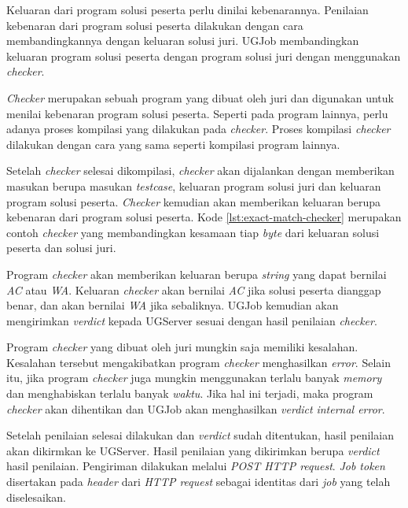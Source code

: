 \par Keluaran dari program solusi peserta perlu dinilai kebenarannya. Penilaian kebenaran dari program solusi peserta dilakukan dengan cara membandingkannya dengan keluaran solusi juri. UGJob membandingkan keluaran program solusi peserta dengan program solusi juri dengan menggunakan \textit{checker}.

\par \textit{Checker} merupakan sebuah program yang dibuat oleh juri dan digunakan untuk menilai kebenaran program solusi peserta. Seperti pada program lainnya, perlu adanya proses kompilasi yang dilakukan pada \textit{checker}. Proses kompilasi \textit{checker} dilakukan dengan cara yang sama seperti kompilasi program lainnya.



\par Setelah \textit{checker} selesai dikompilasi, \textit{checker} akan dijalankan dengan memberikan masukan berupa masukan \textit{testcase}, keluaran program solusi juri dan keluaran program solusi peserta. \textit{Checker} kemudian akan memberikan keluaran berupa kebenaran dari program solusi peserta. Kode \ref{lst:exact-match-checker} merupakan contoh \textit{checker} yang membandingkan kesamaan tiap \textit{byte} dari keluaran solusi peserta dan solusi juri.

\par Program \textit{checker} akan memberikan keluaran berupa \textit{string} yang dapat bernilai \textit{AC} atau \textit{WA}. Keluaran \textit{checker} akan bernilai \textit{AC} jika solusi peserta dianggap benar, dan akan bernilai \textit{WA} jika sebaliknya. UGJob kemudian akan mengirimkan \textit{verdict} kepada UGServer sesuai dengan hasil penilaian \textit{checker}.

\par Program \textit{checker} yang dibuat oleh juri mungkin saja memiliki kesalahan. Kesalahan tersebut mengakibatkan program \textit{checker} menghasilkan \textit{error}. Selain itu, jika program \textit{checker} juga mungkin menggunakan terlalu banyak \textit{memory} dan menghabiskan terlalu banyak \textit{waktu}. Jika hal ini terjadi, maka program \textit{checker} akan dihentikan dan UGJob akan menghasilkan \textit{verdict} \textit{internal error}.

\par Setelah penilaian selesai dilakukan dan \textit{verdict} sudah ditentukan, hasil penilaian akan dikirmkan ke UGServer. Hasil penilaian yang dikirimkan berupa \textit{verdict} hasil penilaian. Pengiriman dilakukan melalui \textit{POST HTTP request}. \textit{Job token} disertakan pada \textit{header} dari \textit{HTTP request} sebagai identitas dari \textit{job} yang telah diselesaikan.

